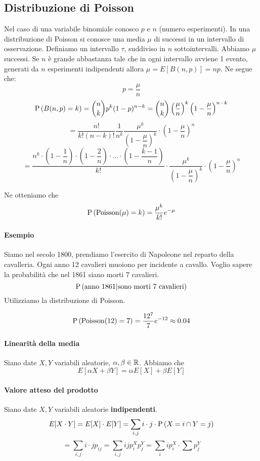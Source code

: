 \subsection{Distribuzione di Poisson}
Nel caso di una variabile binomiale conosco $ p $ e $ n $ (numero esperimenti).
In una distribuzione di Poisson si conosce una media $ \mu $ di successi in un intervallo di osservazione.
Definiamo un intervallo $ \tau $, suddiviso in $ n $ sottointervalli. Abbiamo $ \mu $ successi. Se $ n $ è grande abbastanza tale che in ogni intervallo avviene 1 evento, generati da $ n $ esperimenti indipendenti allora $ \mu = E[B(n,p)] = np$. Ne segue che:
\[ p = \dfrac{\mu}{n} \]
\[ \text{P}\left(B(n,p) = k\right) = \binom{n}{k}p^k(1-p)^{n-k} = \binom{n}{k} \left(\dfrac{\mu}{n}\right)^k \left(1- \dfrac{\mu}{n}\right)^{n-k} \]
\[ = \dfrac{n!}{k!(n-k)!} \dfrac{1}{n^k} \dfrac{\mu^k}{\left(1-\dfrac{\mu}{n}\right)^k} \cdot \left(1-\dfrac{\mu}{n}\right)^n \] 
\[ = \dfrac{n^k \cdot \left(1-\dfrac{1}{n} \right) \cdot \left(1-\dfrac{2}{n}\right) \cdot \dots \cdot \left(1- \dfrac{k-1}{n}\right)}{k!} \cdot \dfrac{\mu^k}{\left(1-\dfrac{\mu}{n}\right)^k} \cdot \left(1-\dfrac{\mu}{n}\right)^n \]

Ne otteniamo che 
\[ \text{P}\left(\text{Poisson}(\mu) = k\right) = \dfrac{\mu^k}{k!} e^{-\mu} \]


\paragraph{Esempio}
Siamo nel secolo 1800, prendiamo l'esercito di Napoleone nel reparto della cavalleria. Ogni anno 12 cavalieri muoiono per incidente a cavallo. Voglio sapere la probabilità che nel 1861 siano morti 7 cavalieri.
\[ \text{P}\left(\text{anno } 1861 | \text{sono morti 7 cavalieri}\right) \]
Utilizziamo la distribuzione di Poisson.

\[ \text{P}\left(\text{Poisson}(12) = 7\right) = \dfrac{12^7}{7}e^{-12} \approx 0.04  \]


\paragraph{Linearità della media}

Siano date $ X,Y $ variabili aleatorie, $ \alpha ,\beta \in \mathbb{R} $. Abbiamo che
\[ E[\alpha X + \beta Y] = \alpha E[X] + \beta E[Y] \]


\paragraph{Valore atteso del prodotto}
Siano date $ X,Y $ variabili aleatorie \textbf{indipendenti}.
\[ E[X \cdot Y] = E[X] \cdot E[Y] = \sum_{i,j} i \cdot j \cdot \text{P}\left(X = i \cap Y =j\right)\]
\[ = \sum_{i,j} i \cdot j p_{ij} = \sum_{i,j} ij p_i^X p_j^Y =  \sum_{i} i p_i^X \cdot \sum p_j^Y\]